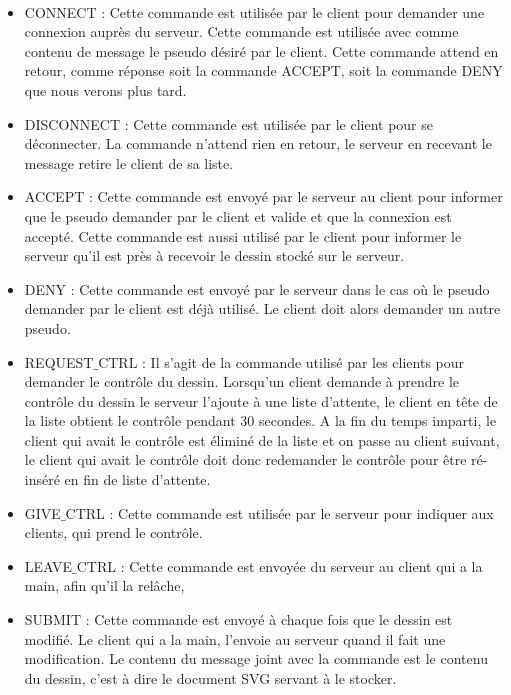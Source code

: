 \documentclass[a4paper,11pt]{article}
\begin{document}
\paragraph{}\begin{itemize}
\item CONNECT : Cette commande est utilisée par le client pour demander une connexion auprès du serveur. Cette commande est utilisée avec comme contenu de message le pseudo désiré par le client. Cette commande attend en retour, comme réponse soit la commande ACCEPT, soit la commande DENY que nous verons plus tard.

\item DISCONNECT : Cette commande est utilisée par le client pour se déconnecter. La commande n'attend rien en retour, le serveur en recevant le message retire le client de sa liste.

\item ACCEPT : Cette commande est envoyé par le serveur au client pour informer que le pseudo demander par le client et valide et que la connexion est accepté. Cette commande est aussi utilisé par le client pour informer le serveur qu'il est près à recevoir le dessin stocké sur le serveur.

\item DENY : Cette commande est envoyé par le serveur dans le cas où le pseudo demander par le client est déjà utilisé. Le client doit alors demander un autre pseudo.

\item  REQUEST$\_$CTRL : Il s'agit de la commande utilisé par les clients pour demander le contrôle du dessin.  Lorsqu'un client demande à prendre le contrôle du dessin le serveur l'ajoute à une liste d'attente, le client en tête de la liste obtient le contrôle pendant 30 secondes. A la fin du temps imparti, le client qui avait le contrôle est éliminé de la liste et on passe au client suivant, le client qui avait le contrôle doit donc redemander le contrôle pour être ré-inséré en fin de liste d'attente.

\item GIVE$\_$CTRL : Cette commande est utilisée par le serveur pour indiquer aux clients, qui prend le contrôle. 

\item LEAVE$\_$CTRL : Cette commande est envoyée du serveur au client qui a la main, afin qu'il la relâche,

\item SUBMIT : Cette commande est envoyé à chaque fois que le dessin est modifié. Le client qui a la main, l'envoie au serveur quand il fait une modification. Le contenu du message joint avec la commande est le contenu du dessin, c'est à dire le document SVG servant à le stocker.


\end{itemize}
\end{document}
